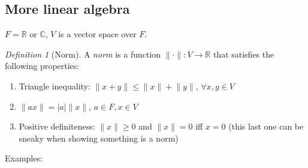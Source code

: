 \documentclass{article}
\theoremstyle{plain}
\theoremstyle{remark}
\newtheorem{definition}{Definition}
\newcommand{\R}{{\mathbb R}}
\newcommand{\C}{{\mathbb C}}
\begin{document}
\subsection{More linear algebra}
$F = \R$ or $\C$, $V$ is a vector space over $F$.
\begin{definition}[Norm]
	A \emph{norm} is a function $\lVert \cdot \rVert \colon V \to \R$
	that satisfies the following properties:
	\begin{enumerate}
		\item Triangle inequality: $\lVert x + y \rVert \leq \lVert x \rVert + \lVert y \rVert$,
			$\forall x,y \in V$
		\item $\lVert ax \rVert = |a|\lVert x \rVert$, $a \in F, x \in V$
		\item Positive definiteness: $\lVert x \rVert \geq 0$
			and $\lVert x \rVert = 0$ iff $x = 0$
			(this last one can be sneaky when showing something is a norm)
	\end{enumerate}
\end{definition}
Examples:
\end{document}
